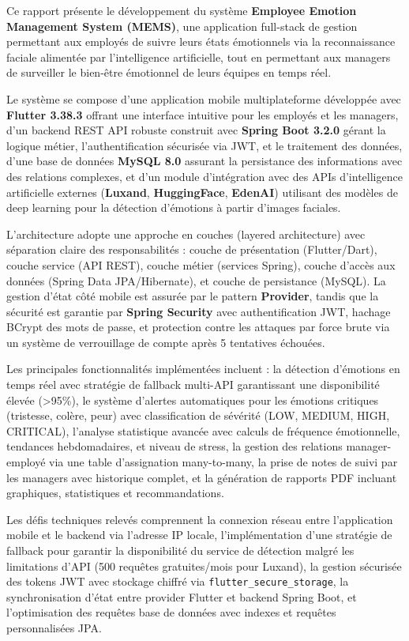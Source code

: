 \documentclass[a4paper,11pt]{report}
\begin{document}
Ce rapport présente le développement du système \textbf{Employee Emotion Management System (MEMS)}, une application full-stack de gestion permettant aux employés de suivre leurs états émotionnels via la reconnaissance faciale alimentée par l'intelligence artificielle, tout en permettant aux managers de surveiller le bien-être émotionnel de leurs équipes en temps réel.

Le système se compose d'une application mobile multiplateforme développée avec \textbf{Flutter 3.38.3} offrant une interface intuitive pour les employés et les managers, d'un backend REST API robuste construit avec \textbf{Spring Boot 3.2.0} gérant la logique métier, l'authentification sécurisée via JWT, et le traitement des données, d'une base de données \textbf{MySQL 8.0} assurant la persistance des informations avec des relations complexes, et d'un module d'intégration avec des APIs d'intelligence artificielle externes (\textbf{Luxand}, \textbf{HuggingFace}, \textbf{EdenAI}) utilisant des modèles de deep learning pour la détection d'émotions à partir d'images faciales.

L'architecture adopte une approche en couches (layered architecture) avec séparation claire des responsabilités : couche de présentation (Flutter/Dart), couche service (API REST), couche métier (services Spring), couche d'accès aux données (Spring Data JPA/Hibernate), et couche de persistance (MySQL). La gestion d'état côté mobile est assurée par le pattern \textbf{Provider}, tandis que la sécurité est garantie par \textbf{Spring Security} avec authentification JWT, hachage BCrypt des mots de passe, et protection contre les attaques par force brute via un système de verrouillage de compte après 5 tentatives échouées.

Les principales fonctionnalités implémentées incluent : la détection d'émotions en temps réel avec stratégie de fallback multi-API garantissant une disponibilité élevée (>95\%), le système d'alertes automatiques pour les émotions critiques (tristesse, colère, peur) avec classification de sévérité (LOW, MEDIUM, HIGH, CRITICAL), l'analyse statistique avancée avec calculs de fréquence émotionnelle, tendances hebdomadaires, et niveau de stress, la gestion des relations manager-employé via une table d'assignation many-to-many, la prise de notes de suivi par les managers avec historique complet, et la génération de rapports PDF incluant graphiques, statistiques et recommandations.

Les défis techniques relevés comprennent la connexion réseau entre l'application mobile et le backend via l'adresse IP locale, l'implémentation d'une stratégie de fallback pour garantir la disponibilité du service de détection malgré les limitations d'API (500 requêtes gratuites/mois pour Luxand), la gestion sécurisée des tokens JWT avec stockage chiffré via \texttt{flutter\_secure\_storage}, la synchronisation d'état entre provider Flutter et backend Spring Boot, et l'optimisation des requêtes base de données avec indexes et requêtes personnalisées JPA.
\end{document}
